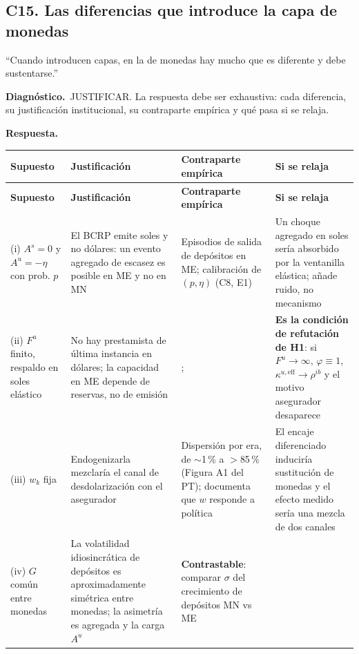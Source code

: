 \documentclass[11pt]{article}
\newcommand{\diag}[1]{\par\noindent\textbf{Diagn\'ostico.}\ #1\par}
\newcommand{\resp}{\par\noindent\textbf{Respuesta.}\par}
\theoremstyle{definition}
\begin{document}
\subsection{C15. Las diferencias que introduce la capa de monedas}
\label{sub:C15}

\begin{jurado}
``Cuando introducen capas, en la de monedas hay mucho que es diferente y debe
sustentarse.''
\end{jurado}

\diag{JUSTIFICAR. La respuesta debe ser exhaustiva: cada diferencia, su
justificaci\'on institucional, su contraparte emp\'irica y qu\'e pasa si se relaja.}

\resp

\begin{longtable}{@{}p{3.5cm}p{4.4cm}p{3.0cm}p{3.6cm}@{}}
\toprule
\textbf{Supuesto} & \textbf{Justificaci\'on} & \textbf{Contraparte emp\'irica} &
\textbf{Si se relaja} \\
\midrule
\endfirsthead
\toprule
\textbf{Supuesto} & \textbf{Justificaci\'on} & \textbf{Contraparte emp\'irica} &
\textbf{Si se relaja} \\
\midrule
\endhead
(i) $A^s=0$ y $A^u=-\eta$ con prob. $p$ &
El BCRP emite soles y no d\'olares: un evento agregado de escasez es posible en ME
y no en MN &
Episodios de salida de dep\'ositos en ME; calibraci\'on de $(p,\eta)$ (C8, E1) &
Un choque agregado en soles ser\'ia absorbido por la ventanilla el\'astica; a\~nade
ruido, no mecanismo \\
(ii) $F^u$ finito, respaldo en soles el\'astico &
No hay prestamista de \'ultima instancia en d\'olares; la capacidad en ME depende de
reservas, no de emisi\'on &
\citet{levyyeyati2008}; \citet{bocolalorenzoni2020} &
\textbf{Es la condici\'on de refutaci\'on de H1}: si $F^u\to\infty$, $\varphi\equiv1$,
$\kappa^{u,\mathrm{eff}}\to\rho^{ib}$ y el motivo asegurador desaparece \\
(iii) $w_k$ fija &
Endogenizarla mezclar\'ia el canal de desdolarizaci\'on con el asegurador &
Dispersi\'on por era, de $\sim$1\,\% a $>$85\,\% (Figura A1 del PT);
\citet{castillo2016} documenta que $w$ responde a pol\'itica &
El encaje diferenciado inducir\'ia sustituci\'on de monedas y el efecto medido
ser\'ia una mezcla de dos canales \\
(iv) $G$ com\'un entre monedas &
La volatilidad idiosincr\'atica de dep\'ositos es aproximadamente sim\'etrica entre
monedas; la asimetr\'ia es agregada y la carga $A^u$ &
\textbf{Contrastable}: comparar $\sigma$ del crecimiento de dep\'ositos MN vs ME

\end{longtable}
\end{document}
